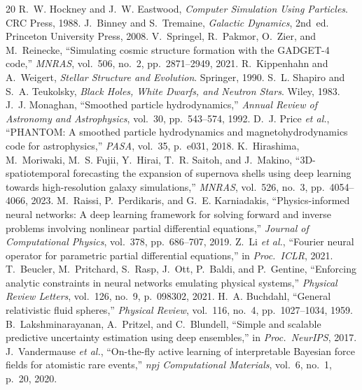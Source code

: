 \documentclass[10pt,twocolumn,letterpaper]{article}
\begin{document}
\begin{thebibliography}{20}
\small
\setlength{\itemsep}{0pt}
\setlength{\parskip}{1pt}
 R.~W. Hockney and J.~W. Eastwood, \emph{Computer Simulation Using Particles}. CRC Press, 1988.
 J.~Binney and S.~Tremaine, \emph{Galactic Dynamics}, 2nd~ed. Princeton University Press, 2008.
 V.~Springel, R.~Pakmor, O.~Zier, and M.~Reinecke, ``Simulating cosmic structure formation with the GADGET-4 code,'' \emph{MNRAS}, vol.~506, no.~2, pp.~2871--2949, 2021.
 R.~Kippenhahn and A.~Weigert, \emph{Stellar Structure and Evolution}. Springer, 1990.
 S.~L. Shapiro and S.~A. Teukolsky, \emph{Black Holes, White Dwarfs, and Neutron Stars}. Wiley, 1983.
 J.~J. Monaghan, ``Smoothed particle hydrodynamics,'' \emph{Annual Review of Astronomy and Astrophysics}, vol.~30, pp.~543--574, 1992.
 D.~J. Price \emph{et al.}, ``PHANTOM: A smoothed particle hydrodynamics and magnetohydrodynamics code for astrophysics,'' \emph{PASA}, vol.~35, p.~e031, 2018.
 K.~Hirashima, M.~Moriwaki, M.~S. Fujii, Y.~Hirai, T.~R. Saitoh, and J.~Makino, ``3D-spatiotemporal forecasting the expansion of supernova shells using deep learning towards high-resolution galaxy simulations,'' \emph{MNRAS}, vol.~526, no.~3, pp.~4054--4066, 2023.
 M.~Raissi, P.~Perdikaris, and G.~E. Karniadakis, ``Physics-informed neural networks: A deep learning framework for solving forward and inverse problems involving nonlinear partial differential equations,'' \emph{Journal of Computational Physics}, vol.~378, pp.~686--707, 2019.
 Z.~Li \emph{et al.}, ``Fourier neural operator for parametric partial differential equations,'' in \emph{Proc.\ ICLR}, 2021.
 T.~Beucler, M.~Pritchard, S.~Rasp, J.~Ott, P.~Baldi, and P.~Gentine, ``Enforcing analytic constraints in neural networks emulating physical systems,'' \emph{Physical Review Letters}, vol.~126, no.~9, p.~098302, 2021.
 H.~A. Buchdahl, ``General relativistic fluid spheres,'' \emph{Physical Review}, vol.~116, no.~4, pp.~1027--1034, 1959.
 B.~Lakshminarayanan, A.~Pritzel, and C.~Blundell, ``Simple and scalable predictive uncertainty estimation using deep ensembles,'' in \emph{Proc.\ NeurIPS}, 2017.
 J.~Vandermause \emph{et al.}, ``On-the-fly active learning of interpretable Bayesian force fields for atomistic rare events,'' \emph{npj Computational Materials}, vol.~6, no.~1, p.~20, 2020.

\end{thebibliography}
\end{document}
